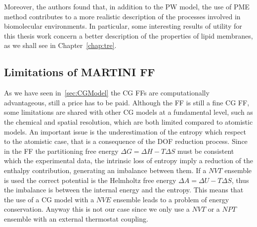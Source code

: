 Moreover, the authors found that, in addition to the \ac{PW} model, the use of \ac{PME} method contributes to a 
more realistic description of the processes involved in biomolecular environments. In particular, some 
interesting results of utility for this thesis work concern a better description of the properties of lipid 
membranes, as we shall see in Chapter~\ref{chap:tre}.
			
\subsection{Limitations of MARTINI FF}
As we have seen in~\ref{sec:CGModel} the \ac{CG} \acp{FF} are computationally advantageous, still a price has to 
be paid. Although the \martini \ac{FF} is still a fine \ac{CG} \ac{FF}, some limitations are shared with other 
\ac{CG} models at a fundamental level, such as the chemical and spatial resolution, which are both limited 
compared to atomistic models. An important issue is the underestimation of the entropy which respect to the 
atomistic case, that is a consequence of the \ac{DOF} reduction process. Since in the \martini \ac{FF} the 
partitioning free energy $\Delta G = \Delta H - T\Delta S$ must be consistent which the experimental data, the 
intrinsic loss of entropy imply a reduction of the enthalpy contribution, generating an imbalance between them. 
If a $NVT$ ensemble is used the correct potential is the Helmholtz free energy $\Delta A = \Delta U - T\Delta S$, 
thus the imbalance is between the internal energy and the entropy. This means that the use of a \ac{CG} model 
with a $NVE$ ensemble leads to a problem of energy conservation. Anyway this is not our case since we only use a 
$NVT$ or a $NPT$ ensemble with an external thermostat coupling.

